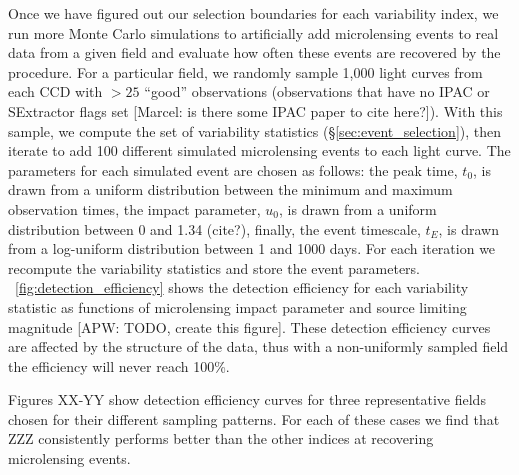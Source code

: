 \documentclass[12pt,preprint]{aastex}
\begin{document}
Once we have figured out our selection boundaries for each variability index, we run more Monte Carlo simulations to artificially add microlensing events to real data from a given field and evaluate how often these events are recovered by the procedure. For a particular field, we randomly sample 1,000 light curves from each CCD with $>25$ ``good'' observations (observations that have no IPAC or SExtractor flags set [Marcel: is there some IPAC paper to cite here?]). With this sample, we compute the set of variability statistics (\S\ref{sec:event_selection}), then iterate to add 100 different simulated microlensing events to each light curve. The parameters for each simulated event are chosen as follows: the peak time, $t_0$, is drawn from a uniform distribution between the minimum and maximum observation times, the impact parameter, $u_0$, is drawn from a uniform distribution between 0 and 1.34 (cite?), finally, the event timescale, $t_E$, is drawn from a log-uniform distribution between 1 and 1000 days. For each iteration we recompute the variability statistics and store the event parameters. \figurename~\ref{fig:detection_efficiency} shows the detection efficiency for each variability statistic as functions of microlensing impact parameter and source limiting magnitude [APW: TODO, create this figure]. These detection efficiency curves are affected by the structure of the data, thus with a non-uniformly sampled field the efficiency will never reach 100\%.

Figures XX-YY show detection efficiency curves for three representative fields chosen for their different sampling patterns. For each of these cases we find that ZZZ consistently performs better than the other indices at recovering microlensing events.




\end{document}
